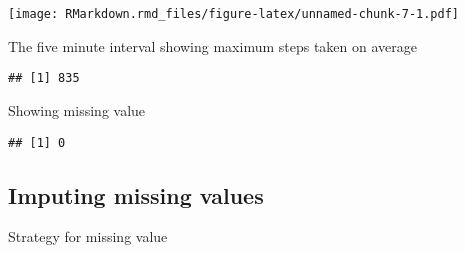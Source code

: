 \documentclass[
]{article}
\newenvironment{Shaded}{\begin{snugshade}}{\end{snugshade}}
\newcommand{\DecValTok}[1]{\textcolor[rgb]{0.00,0.00,0.81}{#1}}
\newcommand{\FunctionTok}[1]{\textcolor[rgb]{0.00,0.00,0.00}{#1}}
\newcommand{\NormalTok}[1]{#1}
\newcommand{\OtherTok}[1]{\textcolor[rgb]{0.56,0.35,0.01}{#1}}
\newcommand{\SpecialCharTok}[1]{\textcolor[rgb]{0.00,0.00,0.00}{#1}}
\begin{document}
\texttt{[image: RMarkdown.rmd\_files/figure-latex/unnamed-chunk-7-1.pdf]}

The five minute interval showing maximum steps taken on average

\begin{Shaded}
\end{Shaded}

\begin{verbatim}
## [1] 835
\end{verbatim}

Showing missing value

\begin{Shaded}
\end{Shaded}

\begin{verbatim}
## [1] 0
\end{verbatim}

\hypertarget{imputing-missing-values}{%
\subsection{Imputing missing values}\label{imputing-missing-values}}

Strategy for missing value
\end{document}
